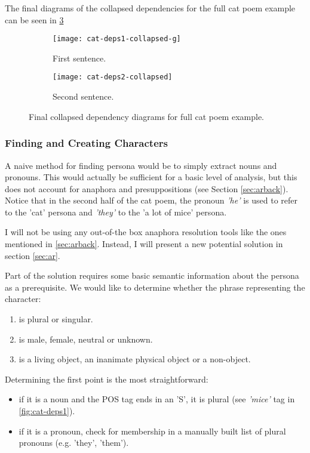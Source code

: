 The final diagrams of the collapsed dependencies for the full cat poem example can be seen in \ref{fig:cat-collapsed}

\begin{figure}[H]
\centering
\begin{subfigure}[t]{0.9\textwidth}
	\centering
    \texttt{[image: cat-deps1-collapsed-g]}
    \caption{First sentence.}
    \label{fig:cat-deps1-collapsed-g-final}
\end{subfigure}
\begin{subfigure}[t]{0.9\textwidth}
	\centering
    \texttt{[image: cat-deps2-collapsed]}
    \caption{Second sentence.}
    \label{fig:cat-deps2-collapsed}
\end{subfigure}
\caption{Final collapsed dependency diagrams for full cat poem example.}
\label{fig:cat-collapsed}
\end{figure}

\subsubsection{Finding and Creating Characters}
\label{sec:characters} 

A naive method for finding persona would be to simply extract nouns and pronouns. This would actually be sufficient for a basic level of analysis, but this does not account for anaphora and presuppositions (see Section \ref{sec:arback}). Notice that in the second half of the cat poem, the pronoun \textit{'he'} is used to refer to the 'cat' persona and \textit{'they'} to the 'a lot of mice' persona.

I will not be using any out-of-the box anaphora resolution tools like the ones mentioned in \ref{sec:arback}. Instead, I will present a new potential solution in section \ref{sec:ar}.

Part of the solution requires some basic semantic information about the persona as a prerequisite. We would like to determine whether the phrase representing the character:

\begin{enumerate}
\item{is plural or singular.}
\item{is male, female, neutral or unknown.}
\item{is a living object, an inanimate physical object or a non-object.}
\end{enumerate}

Determining the first point is the most straightforward:
\begin{itemize}
\item{if it is a noun and the POS tag ends in an 'S', it is plural (see \textit{'mice'} tag in \ref{fig:cat-deps1}).}
\item{if it is a pronoun, check for membership in a manually built list of plural pronouns (e.g. 'they', 'them').}
\end{itemize}

